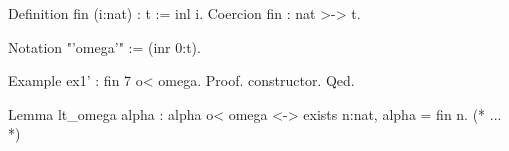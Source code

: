\begin{Coqsrc}
Definition fin (i:nat) : t := inl i.
Coercion fin : nat >-> t.

Notation "'omega'" := (inr  0:t).
\end{Coqsrc}

\begin{Coqsrc}
Example ex1' : fin 7 o< omega.
Proof. constructor. Qed.

Lemma lt_omega alpha : 
     alpha o< omega <-> exists n:nat,  alpha = fin n.
(* ... *)
\end{Coqsrc}





  




  




